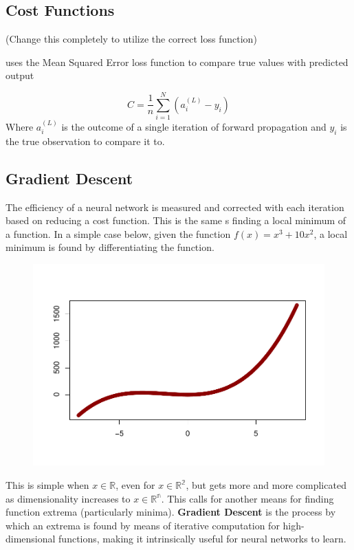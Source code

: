 \hypertarget{cost-functions}{%
\subsection{Cost Functions}\label{cost-functions}}

(Change this completely to utilize the correct loss function)

uses the Mean Squared Error loss function to compare true values with
predicted output

\[
C = \frac{1}{n} \sum_{i=1}^N (a^{(L)}_i - y_i)
\] Where \(a^{(L)}_i\) is the outcome of a single iteration of forward
propagation and \(y_i\) is the true observation to compare it to.


\hypertarget{gradient-descent}{%
\subsection{Gradient Descent}\label{gradient-descent}}

The efficiency of a neural network is measured and corrected with each
iteration based on reducing a cost function. This is the same s finding
a local minimum of a function. In a simple case below, given the
function \(f(x) = x^3 + 10x^2\), a local minimum is found by
differentiating the function.

\begin{figure}
    \centering
    \includegraphics[width = .7\textwidth]{Figures/grad_desc_2D-1.pdf}
\end{figure}

This is simple when \(x \in \mathbb{R}\), even for
\(x \in \mathbb{R^2}\), but gets more and more complicated as
dimensionality increases to \(x \in \mathbb{R^n}\). This calls for
another means for finding function extrema (particularly minima).
\textbf{Gradient Descent} is the process by which an extrema is found by
means of iterative computation for high-dimensional functions, making it
intrinsically useful for neural networks to learn.

